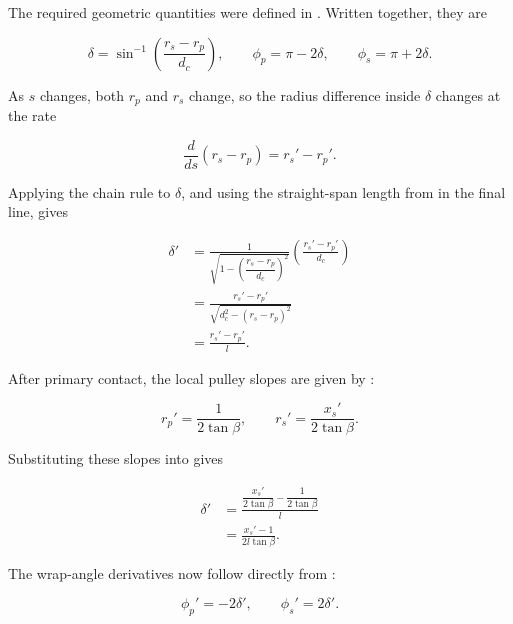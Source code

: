 \documentclass[11pt]{report}
\numberwithin{equation}{section}
\begin{document}
The required geometric quantities were defined in
. Written together, they are

\begin{equation}
    \delta
    =
    \sin^{-1}\!\left(\frac{r_s-r_p}{d_c}\right),
    \qquad
    \phi_p=\pi-2\delta,
    \qquad
    \phi_s=\pi+2\delta.
    \label{eq:wrap_geometry_for_acceleration}
\end{equation}

As \(s\) changes, both \(r_p\) and \(r_s\) change, so the radius difference
inside \(\delta\) changes at the rate

\begin{equation}
    \frac{d}{ds}(r_s-r_p)
    =
    r_s'-r_p'.
    \label{eq:radius_difference_shift_derivative}
\end{equation}

Applying the chain rule to \(\delta\), and using the straight-span length from
 in the final line, gives

\begin{align}
    \delta'
    &=
    \frac{1}
    {\sqrt{1-\left(\dfrac{r_s-r_p}{d_c}\right)^2}}
    \left(
        \frac{r_s'-r_p'}{d_c}
    \right)
    \nonumber\\
    &=
    \frac{r_s'-r_p'}
    {\sqrt{d_c^2-(r_s-r_p)^2}}
    \nonumber\\
    &=
    \frac{r_s'-r_p'}{l}.
    \label{eq:span_angle_shift_derivative}
\end{align}

After primary contact, the local pulley slopes are given by
:

\[
    r_p'
    =
    \frac{1}{2\tan\beta},
    \qquad
    r_s'
    =
    \frac{x_s'}{2\tan\beta}.
\]

Substituting these slopes into
 gives

\begin{align}
    \delta'
    &=
    \frac{
        \dfrac{x_s'}{2\tan\beta}
        -
        \dfrac{1}{2\tan\beta}
    }{l}
    \nonumber\\
    &=
    \frac{x_s'-1}{2l\tan\beta}.
    \label{eq:span_angle_shift_derivative_coordinate_form}
\end{align}

The wrap-angle derivatives now follow directly from
:

\begin{equation}
    \phi_p'=-2\delta',
    \qquad
    \phi_s'=2\delta'.
    \label{eq:wrap_angle_shift_derivatives}
\end{equation}
\end{document}
